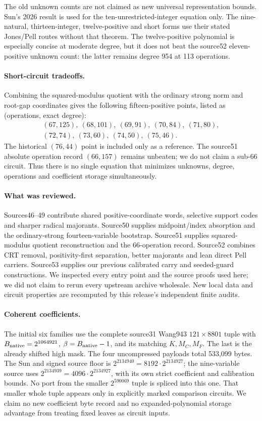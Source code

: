 The old unknown counts are not claimed as new universal representation
bounds. Sun's 2026 result is used for the ten-unrestricted-integer equation
only. The nine-natural, thirteen-integer, twelve-positive and short forms
use their stated Jones/Pell routes without that theorem. The twelve-positive
polynomial is especially concise at moderate degree, but it does not beat
the source52 eleven-positive unknown count: the latter remains degree
954 at 113 operations.

\paragraph{Short-circuit tradeoffs.}
Combining the squared-modulus quotient with the ordinary strong norm and
root-gap coordinates gives the following fifteen-positive points, listed
as (operations, exact degree):
\[\begin{gathered}
 (67,125),\ (68,101),\ (69,91),\ (70,84),\ (71,80),\\
 (72,74),\ (73,60),\ (74,50),\ (75,46).
\end{gathered}\]
The historical $(76,44)$ point is included only as a reference. The
source51 absolute operation record $(66,157)$ remains unbeaten; we do not
claim a sub-66 circuit. Thus there is no single equation that minimizes
unknowns, degree, operations and coefficient storage simultaneously.

\paragraph{What was reviewed.}
Sources46--49 contribute shared positive-coordinate words, selective support
codes and sharper radical majorants. Source50 supplies midpoint/index
absorption and the ordinary-strong fourteen-variable bootstrap. Source51
supplies squared-modulus quotient reconstruction and the 66-operation
record. Source52 combines CRT removal, positivity-first separation, better
majorants and lean direct Pell carriers. Source53 supplies our previous
calibrated carry and seeded-guard constructions. We inspected every entry
point and the source proofs used here; we did not claim to rerun every
upstream archive wholesale. New local data and circuit properties are
recomputed by this release's independent finite audits.

\paragraph{Coherent coefficients.}
The initial six families use the complete source31 Wang943 $121\times8801$
tuple with $B_{\rm native}=2^{1064921}$, $\beta=B_{\rm native}-1$, and its
matching $K,M_C,M_F$. The last is the already shifted high mask. The four
uncompressed payloads total 533,099 bytes. The Sun and signed source floor is $2^{2134940}=8192\cdot2^{2134927}$;
the nine-variable source uses $2^{2134939}=4096\cdot2^{2134927}$,
with its own strict coefficient and calibration bounds. No port from the smaller
$2^{590069}$ tuple is spliced into this one. That smaller whole tuple appears
only in explicitly marked comparison circuits. We claim no new coefficient
byte record and no expanded-polynomial storage advantage from treating
fixed leaves as circuit inputs.
